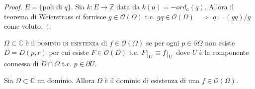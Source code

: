 \begin{proof}
  $E=\{$poli di $q\}$. Sia $k:E \longrightarrow \mathbb{Z}$ data da $k(a)=-ord_a(q)$. Allora il teorema di Weierstrass ci fornisce $g \in \mathcal{O}(\Omega)$ t.c. $gq \in \mathcal{O}(\Omega)$ $\implies$ $q=(gq)/g$ come voluto.
\end{proof}

\begin{defn}
  $\Omega \subset \mathbb{C}$ è il \textsc{dominio di esistenza} di $f \in \mathcal{O}(\Omega)$ se per ogni $p \in \partial\Omega$ non esiste $D=D(p,r)$ per cui esiste $F \in \mathcal{O}(D)$ t.c. $F\restrict{U}\equiv f\restrict{U}$ dove $U$ è la componente connessa di $D \cap \Omega$ t.c. $p \in \partial U$.
\end{defn}

\begin{prop}
  Sia $\Omega \subset \mathbb{C}$ un dominio. Allora $\Omega$ è il dominio di esistenza di una $f \in \mathcal{O}(\Omega)$.
\end{prop}

